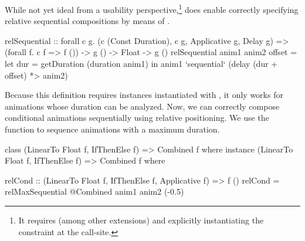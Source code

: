 While not yet ideal from a usability perspective,\footnote{It
requires
 (among other extensions) and explicitly instantiating the
constraint  at the call-site.
}
 \dsl{} does enable correctly
specifying relative sequential compositions by means of .
\begin{spec}
relSequential :: forall c g.
  (c (Const Duration), c g, Applicative g, Delay g) =>
  (forall f. c f => f ()) -> g () -> Float -> g ()
relSequential anim1 anim2 offset = let
  dur = getDuration (duration anim1)
  in anim1 `sequential` (delay (dur + offset) *> anim2)
\end{spec}

Because this definition requires instances instantiated with ,
it only works for animations whose duration can be analyzed. 
Now, we can correctly compose conditional animations sequentially using
relative positioning. We use the  function to sequence
animations with a maximum duration.

\begin{spec}
class (LinearTo Float f, IfThenElse f) => Combined f where
instance (LinearTo Float f, IfThenElse f) => Combined f where

relCond :: (LinearTo Float f, IfThenElse f, Applicative f) => f ()
relCond = relMaxSequential @Combined anim1 anim2 (-0.5)
\end{spec}


